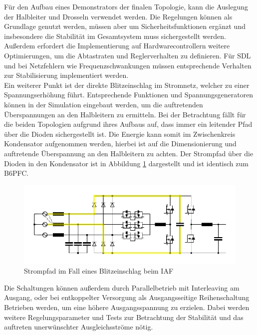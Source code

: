 Für den Aufbau eines Demonstrators der finalen Topologie, kann die Auslegung der Halbleiter und Drosseln verwendet werden. Die Regelungen können als Grundlage genutzt werden, müssen aber um Sicherheitsfunktionen ergänzt und insbesondere die Stabilität im Gesamtsystem muss sichergestellt werden. Außerdem erfordert die Implementierung auf Hardwarecontrollern weitere Optimierungen, um die Abtastraten und Reglerverhalten zu definieren. Für \gls{SDL} und bei Netzfehlern wie Frequenzschwankungen müssen entsprechende Verhalten zur Stabilisierung implementiert werden.\\
Ein weiterer Punkt ist der direkte Blitzeinschlag im Stromnetz, welcher zu einer Spannungserhöhung führt. Entsprechende Funktionen und Spannungsgeneratoren können in der Simulation eingebaut werden, um die auftretenden Überspannungen an den Halbleitern zu ermitteln. Bei der Betrachtung fällt für die beiden Topologien aufgrund ihres Aufbaus auf, dass immer ein leitender Pfad über die Dioden sichergestellt ist. Die Energie kann somit im Zwischenkreis Kondensator aufgenommen werden, hierbei ist auf die Dimensionierung und auftretende Überspannung an den Halbleitern zu achten. Der Strompfad über die Dioden in den Kondensator ist in Abbildung \ref{fig:iafsurge} dargestellt und ist identisch zum \gls{B6PFC}. \\
\begin{figure} [H]
	\centering
	\includegraphics[width=0.95\linewidth]{content/Grafiken/IAF_surge}
	\caption{Strompfad im Fall eines Blitzeinschlag beim IAF}
	\label{fig:iafsurge}
\end{figure}
Die Schaltungen können außerdem durch Parallelbetrieb mit Interleaving am Ausgang, oder bei entkoppelter Versorgung als Ausgangsseitige Reihenschaltung Betrieben werden, um eine höhere Ausgangsspannung zu erzielen. Dabei werden weitere Regelungsparameter und Tests zur Betrachtung der Stabilität und das auftreten unerwünschter Ausgleichsströme nötig.\\